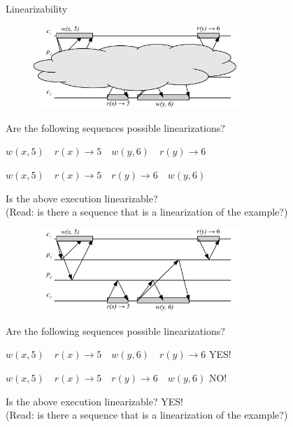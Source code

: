 \begin{frame}{Linearizability}

\begin{overprint}
\begin{figure}
\includegraphics[width=0.7\textwidth]{lin-03}
\end{figure}

\begin{example}
\BI
\item Are the following sequences possible linearizations?
\BI
\item $w(x,5) \quad r(x) \rightarrow 5 \quad w(y,6) \quad r(y) \rightarrow 6$
\item $w(x,5) \quad r(x) \rightarrow 5 \quad r(y) \rightarrow 6 \quad w(y,6)$
\EI
\item Is the above execution linearizable?\\ (Read: is there a sequence that is a linearization of the example?)
\EI
\end{example}

\begin{figure}
\includegraphics[width=0.7\textwidth]{lin-03n}
\end{figure}

\begin{example}

\BI
\item Are the following sequences possible linearizations?
\BI
\item $w(x,5) \quad r(x) \rightarrow 5 \quad w(y,6) \quad r(y) \rightarrow 6$ \qquad YES!
\item $w(x,5) \quad r(x) \rightarrow 5 \quad r(y) \rightarrow 6 \quad w(y,6)$ \qquad NO!
\EI
\item Is the above execution linearizable? \qquad YES!\\ (Read: is there a sequence that is a linearization of the example?)
\EI
\end{example}

\end{overprint}
\end{frame}


